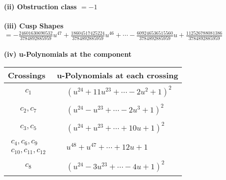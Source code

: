 \documentclass[1p]{elsarticle_modified}
\theoremstyle{definition}
\begin{document}
\flushleft \textbf{(ii) Obstruction class $= -1$}\\~\\
\flushleft \textbf{(iii) Cusp Shapes $= -\frac{24601630690532}{3784892885959} u^{47}+\frac{18604517425224}{3784892885959} u^{46}+\cdots-\frac{609246536515560}{3784892885959} u+\frac{112526788081386}{3784892885959}$}\\~\\
\newpage\renewcommand{\arraystretch}{1}
\flushleft \textbf{(iv) u-Polynomials at the component}\newline \\
\begin{tabular}{m{50pt}|m{274pt}}
Crossings & \hspace{64pt}u-Polynomials at each crossing \\
\hline $$\begin{aligned}c_{1}\end{aligned}$$&$\begin{aligned}
&(u^{24}+11 u^{23}+\cdots-2 u^2+1)^{2}
\end{aligned}$\\
\hline $$\begin{aligned}c_{2},c_{7}\end{aligned}$$&$\begin{aligned}
&(u^{24}- u^{23}+\cdots-2 u^3+1)^{2}
\end{aligned}$\\
\hline $$\begin{aligned}c_{3},c_{5}\end{aligned}$$&$\begin{aligned}
&(u^{24}+u^{23}+\cdots+10 u+1)^{2}
\end{aligned}$\\
\hline $$\begin{aligned}c_{4},c_{6},c_{9}\\c_{10},c_{11},c_{12}\end{aligned}$$&$\begin{aligned}
&u^{48}+u^{47}+\cdots+12 u+1
\end{aligned}$\\
\hline $$\begin{aligned}c_{8}\end{aligned}$$&$\begin{aligned}
&(u^{24}-3 u^{23}+\cdots-4 u+1)^{2}
\end{aligned}$\\
\hline
\end{tabular}\\~\\
\end{document}

